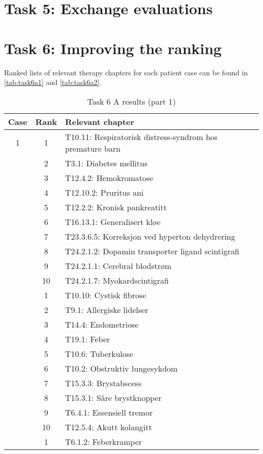 \section{Task 5: Exchange evaluations}


\section{Task 6: Improving the ranking}
Ranked lists of relevant therapy chapters for each patient case can be found
in \autoref{tab:task6a1} and \autoref{tab:task6a2}.
\begin{table}[htbp] \footnotesize \center
\caption{Task 6 A results (part 1)\label{tab:task6a1}}
\begin{tabular}{c c l}
    \toprule
    Case & Rank & Relevant chapter \\
    \midrule
	1 & 1 & T10.11: Respiratorisk distress-syndrom hos premature barn \\
	 & 2 & T3.1: Diabetes mellitus \\
	 & 3 & T12.4.2: Hemokromatose \\
	 & 4 & T12.10.2: Pruritus ani \\
	 & 5 & T12.2.2: Kronisk pankreatitt \\
	 & 6 & T16.13.1: Generalisert kløe \\
	 & 7 & T23.3.6.5: Korreksjon ved hyperton dehydrering \\
	 & 8 & T24.2.1.2: Dopamin transporter ligand scintigrafi \\
	 & 9 & T24.2.1.1: Cerebral blodstrøm \\
	 & 10 & T24.2.1.7: Myokardscintigrafi \\
	\addlinespace
	2 & 1 & T10.10: Cystisk fibrose \\
	 & 2 & T9.1: Allergiske lidelser \\
	 & 3 & T14.4: Endometriose \\
	 & 4 & T19.1: Feber \\
	 & 5 & T10.6: Tuberkulose \\
	 & 6 & T10.2: Obstruktiv lungesykdom \\
	 & 7 & T15.3.3: Brystabscess \\
	 & 8 & T15.3.1: Såre brystknopper \\
	 & 9 & T6.4.1: Essensiell tremor \\
	 & 10 & T12.5.4: Akutt kolangitt \\
	\addlinespace
	3 & 1 & T6.1.2: Feberkramper \\

\end{tabular}
\end{table}
